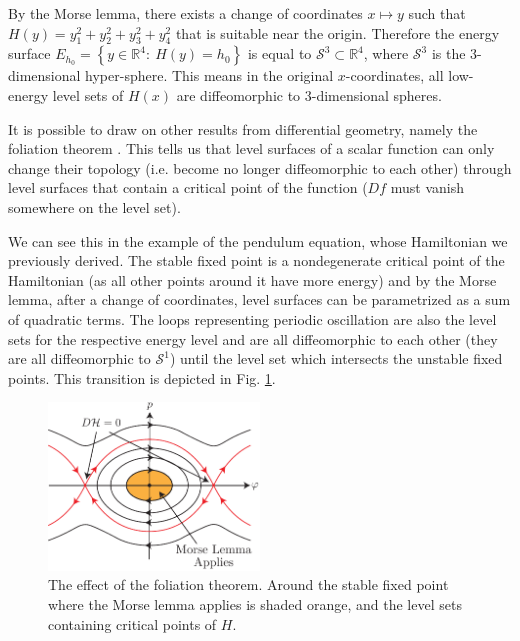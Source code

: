 \begin{ex}
By the Morse lemma, there exists a change of coordinates $x\mapsto y$ such that $H(y) = y_{1}^{2} + y_{2}^{2} + y_{3}^{2}+y_{4}^{2}$ that is suitable near the origin. Therefore the energy surface $E_{h_0} = \left\{ y \in \mathbb{R}^{4}:\ H(y) = h_0\right\}$ is equal to $\mathcal{S}^3 \subset \mathbb{R}^{4}$, where $\mathcal{S}^{3}$ is the 3-dimensional hyper-sphere. This means in the original $x$-coordinates, all low-energy level sets of $H(x)$ are diffeomorphic to $3$-dimensional spheres.
\end{ex}

It is possible to draw on other results from differential geometry, namely the foliation theorem \cite{Milnor1965}. This tells us that level surfaces of a scalar function can only change their topology (i.e. become no longer diffeomorphic to each other) through level surfaces that contain a critical point of the function ($Df$ must vanish somewhere on the level set). 

We can see this in the example of the pendulum equation, whose Hamiltonian we previously derived. The stable fixed point is a nondegenerate critical point of the Hamiltonian (as all other points around it have more energy) and by the Morse lemma, after a change of coordinates, level surfaces can be parametrized as a sum of quadratic terms. The loops representing periodic oscillation are also the level sets for the respective energy level and are all diffeomorphic to each other (they are all diffeomorphic to $\mathcal{S}^{1}$) until the level set which intersects the unstable fixed points. This transition is depicted in Fig. \ref{fig:morse_foliation}.

\begin{figure}[h!]
	\centering
	\includegraphics[width=0.5\textwidth]{figures/ch8/5morse_foliation.pdf}
	\caption{The effect of the foliation theorem. Around the stable fixed point where the Morse lemma applies is shaded orange, and the level sets containing critical points of $H$.}
	\label{fig:morse_foliation}
\end{figure}

